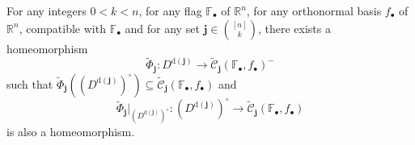 \begin{lemma}\label{lem:shub_dim} For any integers $0<k<n$, for any flag $\mathbb{F}_{\bullet}$ of $\mathbb{R}^n$, for any orthonormal basis $f_{\bullet}$ of $\mathbb{R}^n$, compatible with $\mathbb{F}_{\bullet}$ and for any set $\mathbf{j}\in\binom{[n]}{k}$, there exists a homeomorphism
\[\tilde{\Phi}_{\mathbf{j}}:D^{\mathrm{d}(\mathbf{j})}\to\tilde{\mathcal{C}}_{\mathbf{j}}{\left(\mathbb{F}_{\bullet},f_{\bullet}\right)}^-\]
such that $\tilde{\Phi}_{\mathbf{j}}\left({\left(D^{\mathrm{d}(\mathbf{j})}\right)}^{\circ}\right)\subseteq\tilde{\mathcal{C}}_{\mathbf{j}}(\mathbb{F}_{\bullet},f_{\bullet})$ and
\[\tilde{\Phi}_{\mathbf{j}}|_{{\left(D^{\mathrm{d}(\mathbf{j})}\right)}^{\circ}}:{\left(D^{\mathrm{d}(\mathbf{j})}\right)}^{\circ}\to\tilde{\mathcal{C}}_{\mathbf{j}}(\mathbb{F}_{\bullet},f_{\bullet})\]
is also a homeomorphism.
\end{lemma}
